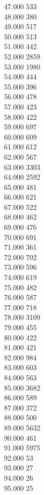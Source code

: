 { 47.000	533 \\
 48.000	380 \\
 49.000	517 \\
 50.000	513 \\
 51.000	442 \\
 52.000	2859 \\
 53.000	1980 \\
 54.000	444 \\
 55.000	396 \\
 56.000	478 \\
 57.000	423 \\
 58.000	422 \\
 59.000	697 \\
 60.000	609 \\
 61.000	612 \\
 62.000	567 \\
 63.000	3303 \\
 64.000	2592 \\
 65.000	481 \\
 66.000	621 \\
 67.000	522 \\
 68.000	462 \\
 69.000	476 \\
 70.000	691 \\
 71.000	361 \\
 72.000	702 \\
 73.000	596 \\
 74.000	619 \\
 75.000	482 \\
 76.000	587 \\
 77.000	718 \\
 78.000	3109 \\
 79.000	455 \\
 80.000	422 \\
 81.000	421 \\
 82.000	984 \\
 83.000	603 \\
 84.000	563 \\
 85.000	3682 \\
 86.000	589 \\
 87.000	372 \\
 88.000	500 \\
 89.000	5632 \\
 90.000	461 \\
 91.000	5975 \\
 92.000	53 \\
 93.000	27 \\
 94.000	26 \\
 95.000	25 \\
}
